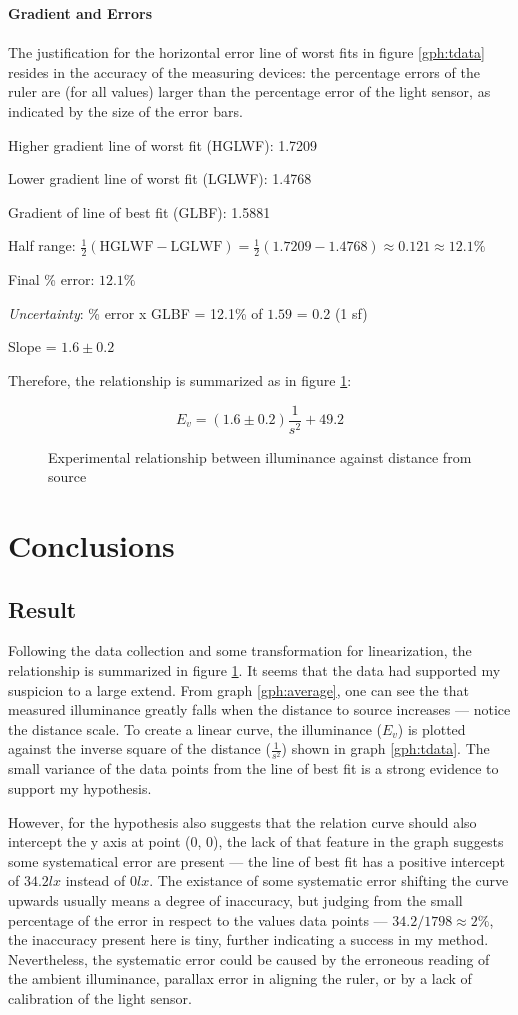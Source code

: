 \documentclass[a4paper,12pt]{article}
\newcommand{\paragraphnl}[1]{\textbf{#1}\\\\}
\begin{document}
\paragraphnl{Gradient and Errors}
The justification for the horizontal error line of worst fits in figure \ref{gph:tdata} resides in the accuracy of the measuring devices: the percentage errors of the ruler are (for all values) larger than the percentage error of the light sensor, as indicated by the size of the error bars.


Higher gradient line of worst fit (HGLWF): 1.7209

Lower gradient line of worst fit (LGLWF): 1.4768

Gradient of line of best fit (GLBF): 1.5881

Half range: $\frac{1}{2} (\text{HGLWF} - \text{LGLWF})= \frac{1}{2}(1.7209-1.4768) \approx 0.121 \approx 12.1\% $

Final \% error: $12.1\%$

\textit{Uncertainty}: \% error x GLBF = 12.1\% of $1.59$ = 0.2 (1 sf)

Slope = $1.6 \pm 0.2$

Therefore, the relationship is summarized as in figure \ref{fig:rel}:
\begin{figure}[h!]
    \[
       E_v = (1.6 \pm 0.2) \frac{1}{s^2} + 49.2
    \]
    \caption{Experimental relationship between illuminance against distance from source}
    \label{fig:rel}
\end{figure}

\section{Conclusions}
\subsection{Result}

Following the data collection and some transformation for linearization, the relationship is summarized in figure \ref{fig:rel}. It seems that the data had supported my suspicion to a large extend. From graph \ref{gph:average}, one can see the that measured illuminance  greatly falls when the distance to source increases --- notice the distance scale. To create a linear curve, the illuminance ($E_v$) is plotted against the inverse square of the distance ($\frac{1}{s^2}$) shown in graph \ref{gph:tdata}. The small variance of the data points from the line of best fit is a strong evidence to support my hypothesis.

However, for the hypothesis also suggests that the relation curve should also intercept the y axis at point (0, 0), the lack of that feature in the graph suggests some systematical error are present --- the line of best fit has a positive intercept of $34.2 \si{lx}$ instead of $0 \si{lx}$. The existance of some systematic error shifting the curve upwards usually means a degree of inaccuracy, but judging from the small percentage of the error in respect to the values data points --- $34.2 / 1798 \approx 2\%$, the inaccuracy present here is tiny, further indicating a success in my method. Nevertheless, the systematic error could be caused by the erroneous reading of the ambient illuminance, parallax error in aligning the ruler, or by a lack of calibration of the light sensor.
\end{document}
